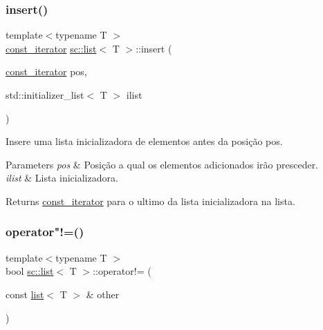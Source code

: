 \subsubsection{\texorpdfstring{insert()}{insert()}\hspace{0.1cm}{\footnotesize\ttfamily [6/6]}}
{\footnotesize\ttfamily template$<$typename T $>$ \\
\hyperlink{classsc_1_1list_1_1const__iterator}{const\+\_\+iterator} \hyperlink{classsc_1_1list}{sc\+::list}$<$ T $>$\+::insert (\begin{DoxyParamCaption}\item[{\hyperlink{classsc_1_1list_1_1const__iterator}{const\+\_\+iterator}}]{pos,  }\item[{std\+::initializer\+\_\+list$<$ T $>$}]{ilist }\end{DoxyParamCaption})\hspace{0.3cm}{\ttfamily [inline]}}

Insere uma lista inicializadora de elementos antes da posição pos. 
\begin{DoxyParams}{Parameters}
{\em pos} & Posição a qual os elementos adicionados irão presceder. \\
\hline
{\em ilist} & Lista inicializadora. \\
\hline
\end{DoxyParams}
\begin{DoxyReturn}{Returns}
\hyperlink{classsc_1_1list_1_1const__iterator}{const\+\_\+iterator} para o ultimo da lista inicializadora na lista. 
\end{DoxyReturn}
\mbox{\label{classsc_1_1list_ad7aaf392a76a163e522bf73d8868c3cf}} 
\subsubsection{\texorpdfstring{operator"!=()}{operator!=()}}
{\footnotesize\ttfamily template$<$typename T $>$ \\
bool \hyperlink{classsc_1_1list}{sc\+::list}$<$ T $>$\+::operator!= (\begin{DoxyParamCaption}\item[{const \hyperlink{classsc_1_1list}{list}$<$ T $>$ \&}]{other }\end{DoxyParamCaption})\hspace{0.3cm}{\ttfamily [inline]}}

